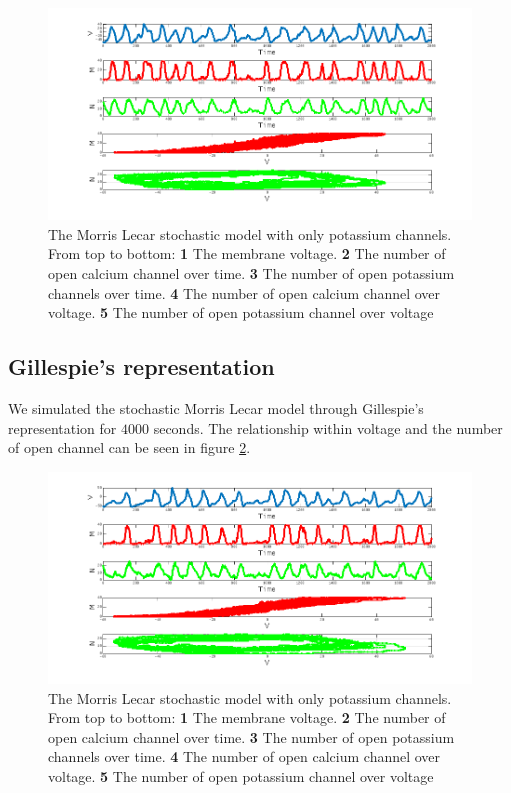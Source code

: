 		\begin{figure}
			\includegraphics[width=\textwidth]{Figures/ml-rtc-4}
			\caption{The Morris Lecar stochastic model with only potassium channels. From top to bottom: \textbf{1} The membrane voltage. \textbf{2} The number of open calcium channel over time. \textbf{3} The number of open potassium channels over time. \textbf{4} The number of open calcium channel over voltage. \textbf{5} The number of open potassium channel over voltage}
			\label{fig:ml-rtc-4}
		\end{figure}

	\subsection{Gillespie's representation}
	We simulated the stochastic Morris Lecar model through Gillespie's representation for $4000$ seconds.
	The relationship within voltage and the number of open channel can be seen in figure \ref{fig:ml-gill-4}.

	\begin{figure}
		\includegraphics[width=\textwidth]{Figures/ml-gill-4}
		\caption{The Morris Lecar stochastic model with only potassium channels. From top to bottom: \textbf{1} The membrane voltage. \textbf{2} The number of open calcium channel over time. \textbf{3} The number of open potassium channels over time. \textbf{4} The number of open calcium channel over voltage. \textbf{5} The number of open potassium channel over voltage}
		\label{fig:ml-gill-4}
	\end{figure}
